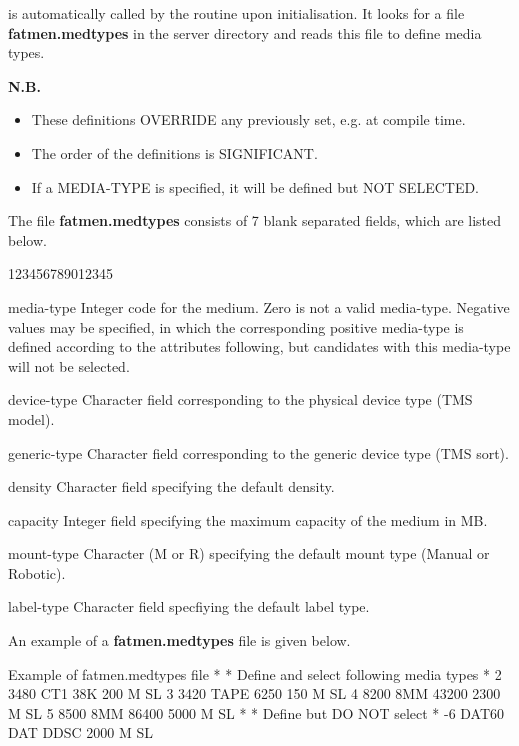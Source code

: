  is automatically called by the routine 
upon initialisation. It looks for a file {\bf fatmen.medtypes} in
the server directory and reads this file to define media types.

{\bf N.B. 
\begin{itemize}
\item
These definitions OVERRIDE any previously set, 
e.g. at compile time.
\item
The order of the definitions is SIGNIFICANT.
\item
If a MEDIA-TYPE is specified, it will be defined but NOT SELECTED.
\end{itemize}
}

The file {\bf fatmen.medtypes} consists of 7 blank separated
fields, which are listed below.

\begin{DLtt}{123456789012345}
\item[media-type]
Integer code for the medium. Zero is not a valid media-type.
Negative values may be specified, in which the corresponding
positive media-type is defined according to the attributes
following, but candidates with this media-type will not be selected.
\item[device-type]
Character field corresponding to the physical device type (TMS model).
\item[generic-type]
Character field corresponding to the generic device type (TMS sort).
\item[density]
Character field specifying the default density.
\item[capacity]
Integer field specifying the maximum capacity of the medium in MB.
\item[mount-type]
Character (M or R) specifying the default mount type (Manual or Robotic).
\item[label-type]
Character field specfiying the default label type.
\end{DLtt}

An example of a {\bf fatmen.medtypes} file is given below.

\begin{XMPt}{Example of fatmen.medtypes file}
*
* Define and select following media types
*
2 3480 CT1 38K 200 M SL
3 3420 TAPE 6250 150 M SL
4 8200 8MM 43200 2300 M SL
5 8500 8MM 86400 5000 M SL
*
* Define but DO NOT select
*
-6 DAT60 DAT DDSC 2000 M SL

\end{XMPt}

